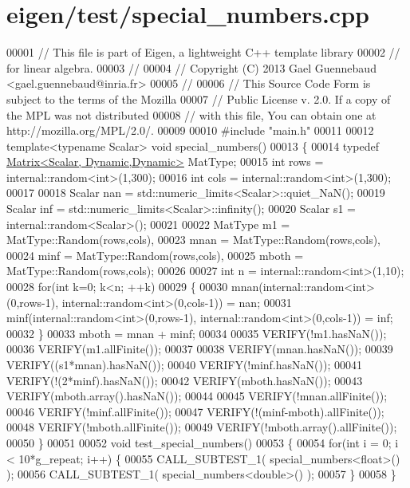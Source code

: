 \hypertarget{eigen_2test_2special__numbers_8cpp_source}{}\section{eigen/test/special\+\_\+numbers.cpp}
\label{eigen_2test_2special__numbers_8cpp_source}

\begin{DoxyCode}
00001 \textcolor{comment}{// This file is part of Eigen, a lightweight C++ template library}
00002 \textcolor{comment}{// for linear algebra.}
00003 \textcolor{comment}{//}
00004 \textcolor{comment}{// Copyright (C) 2013 Gael Guennebaud <gael.guennebaud@inria.fr>}
00005 \textcolor{comment}{//}
00006 \textcolor{comment}{// This Source Code Form is subject to the terms of the Mozilla}
00007 \textcolor{comment}{// Public License v. 2.0. If a copy of the MPL was not distributed}
00008 \textcolor{comment}{// with this file, You can obtain one at http://mozilla.org/MPL/2.0/.}
00009 
00010 \textcolor{preprocessor}{#include "main.h"}
00011 
00012 \textcolor{keyword}{template}<\textcolor{keyword}{typename} Scalar> \textcolor{keywordtype}{void} special\_numbers()
00013 \{
00014   \textcolor{keyword}{typedef} \hyperlink{group___core___module}{Matrix<Scalar, Dynamic,Dynamic>} MatType;
00015   \textcolor{keywordtype}{int} rows = internal::random<int>(1,300);
00016   \textcolor{keywordtype}{int} cols = internal::random<int>(1,300);
00017   
00018   Scalar nan = std::numeric\_limits<Scalar>::quiet\_NaN();
00019   Scalar inf = std::numeric\_limits<Scalar>::infinity();
00020   Scalar s1 = internal::random<Scalar>();
00021   
00022   MatType m1    = MatType::Random(rows,cols),
00023           mnan  = MatType::Random(rows,cols),
00024           minf  = MatType::Random(rows,cols),
00025           mboth = MatType::Random(rows,cols);
00026           
00027   \textcolor{keywordtype}{int} n = internal::random<int>(1,10);
00028   \textcolor{keywordflow}{for}(\textcolor{keywordtype}{int} k=0; k<n; ++k)
00029   \{
00030     mnan(internal::random<int>(0,rows-1), internal::random<int>(0,cols-1)) = nan;
00031     minf(internal::random<int>(0,rows-1), internal::random<int>(0,cols-1)) = inf;
00032   \}
00033   mboth = mnan + minf;
00034   
00035   VERIFY(!m1.hasNaN());
00036   VERIFY(m1.allFinite());
00037   
00038   VERIFY(mnan.hasNaN());
00039   VERIFY((s1*mnan).hasNaN());
00040   VERIFY(!minf.hasNaN());
00041   VERIFY(!(2*minf).hasNaN());
00042   VERIFY(mboth.hasNaN());
00043   VERIFY(mboth.array().hasNaN());
00044   
00045   VERIFY(!mnan.allFinite());
00046   VERIFY(!minf.allFinite());
00047   VERIFY(!(minf-mboth).allFinite());
00048   VERIFY(!mboth.allFinite());
00049   VERIFY(!mboth.array().allFinite());
00050 \}
00051 
00052 \textcolor{keywordtype}{void} test\_special\_numbers()
00053 \{
00054   \textcolor{keywordflow}{for}(\textcolor{keywordtype}{int} i = 0; i < 10*g\_repeat; i++) \{
00055     CALL\_SUBTEST\_1( special\_numbers<float>() );
00056     CALL\_SUBTEST\_1( special\_numbers<double>() );
00057   \}
00058 \}
\end{DoxyCode}
